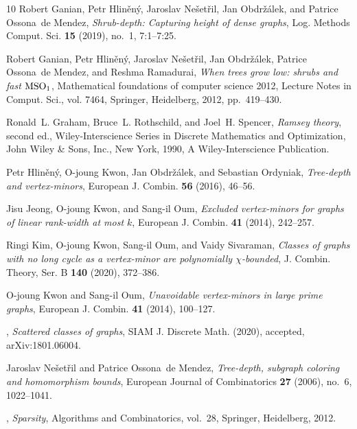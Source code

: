 \documentclass[11pt]{article}
\begin{document}
\begin{thebibliography}{10}
Robert Ganian, Petr Hlin{\v{e}}n{{\'y}}, Jaroslav Ne{\v{s}}et{\v{r}}il, Jan
  Obdr\v{z}\'{a}lek, and Patrice Ossona~de Mendez, \emph{Shrub-depth: Capturing
  height of dense graphs}, Log. Methods Comput. Sci. \textbf{15} (2019), no.~1,
  7:1--7:25.

Robert Ganian, Petr Hlin\v{e}n\'{y}, Jaroslav Ne{\v{s}}et{\v{r}}il, Jan
  Obdr\v{z}\'{a}lek, Patrice Ossona~de Mendez, and Reshma Ramadurai, \emph{When
  trees grow low: shrubs and fast {${\rm MSO}_1$}}, Mathematical foundations of
  computer science 2012, Lecture Notes in Comput. Sci., vol. 7464, Springer,
  Heidelberg, 2012, pp.~419--430.

Ronald~L. Graham, Bruce~L. Rothschild, and Joel~H. Spencer, \emph{Ramsey
  theory}, second ed., Wiley-Interscience Series in Discrete Mathematics and
  Optimization, John Wiley \& Sons, Inc., New York, 1990, A Wiley-Interscience
  Publication. 

Petr Hlin{\v{e}}n{\'y}, O{-}joung Kwon, Jan Obdr{\v{z}}{\'a}lek, and Sebastian
  Ordyniak, \emph{Tree-depth and vertex-minors}, European J. Combin.
  \textbf{56} (2016), 46--56. 

Jisu Jeong, O{-}joung Kwon, and Sang{-}il Oum, \emph{Excluded vertex-minors for
  graphs of linear rank-width at most {$k$}}, European J. Combin. \textbf{41}
  (2014), 242--257. 

Ringi Kim, O{-}joung Kwon, Sang{-}il Oum, and Vaidy Sivaraman, \emph{Classes of
  graphs with no long cycle as a vertex-minor are polynomially
  {$\chi$}-bounded}, J. Combin. Theory, Ser. B \textbf{140} (2020), 372--386.

O{-}joung Kwon and Sang{-}il Oum, \emph{Unavoidable vertex-minors in large
  prime graphs}, European J. Combin. \textbf{41} (2014), 100--127. 

\bysame, \emph{Scattered classes of graphs}, SIAM J. Discrete Math. (2020),
  accepted, arXiv:1801.06004.

Jaroslav Ne{\v{s}}et{\v{r}}il and Patrice Ossona~de Mendez, \emph{Tree-depth,
  subgraph coloring and homomorphism bounds}, European Journal of Combinatorics
  \textbf{27} (2006), no.~6, 1022--1041.

\bysame, \emph{Sparsity}, Algorithms and Combinatorics, vol.~28, Springer,
  Heidelberg, 2012.


\end{thebibliography}
\end{document}
